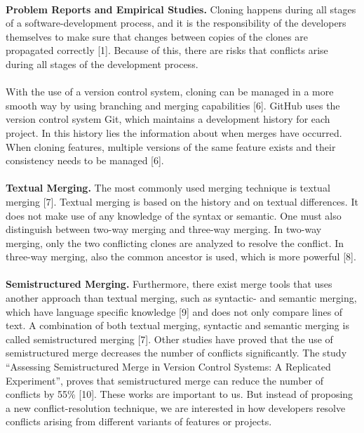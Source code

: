 \paragraph*{}
\textbf{Problem Reports and Empirical Studies.} Cloning happens during all stages of a software-development process, and it is the responsibility of the developers themselves to make sure that changes between copies of the clones are propagated correctly [1]. Because of this, there are risks that conflicts arise during all stages of the development process.

\paragraph*{}
With the use of a version control system, cloning can be managed in a more smooth way by using branching and merging capabilities [6]. GitHub uses the version control system Git, which maintains a development history for each project. In this history lies the information about when merges have occurred. When cloning features, multiple versions of the same feature exists and their consistency needs to be managed [6].

\paragraph*{}
\textbf{Textual Merging.} The most commonly used merging technique is textual merging [7]. Textual merging is based on the history and on textual differences. It does not make use of any knowledge of the syntax or semantic. One must also distinguish between two-way merging and three-way merging. In two-way merging, only the two conflicting clones are analyzed to resolve the conflict. In three-way merging, also the common ancestor is used, which is more powerful [8].

\paragraph*{}
\textbf{Semistructured Merging.} Furthermore, there exist merge tools that uses another approach than textual merging, such as syntactic- and semantic merging, which have language specific knowledge [9] and does not only compare lines of text. A combination of both textual merging, syntactic and semantic merging is called semistructured merging [7]. Other studies have proved that the use of semistructured merge decreases the number of conflicts significantly. The study “Assessing Semistructured Merge in Version Control Systems: A Replicated Experiment”, proves that semistructured merge can reduce the number of conflicts by 55\% [10]. These works are important to us. But instead of proposing a new conflict-resolution technique, we are interested in how developers resolve conflicts arising from different variants of features or projects.

